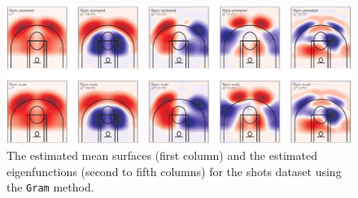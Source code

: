 \begin{figure}
    \centering
    \includegraphics[width=\textwidth]{figures/eigenfunctions_gram}
    \caption{The estimated mean surfaces (first column) and the estimated eigenfunctions (second to fifth columns) for the shots dataset using the \texttt{Gram} method.}
    \label{fig:eigenfunctions_gram}
\end{figure}
